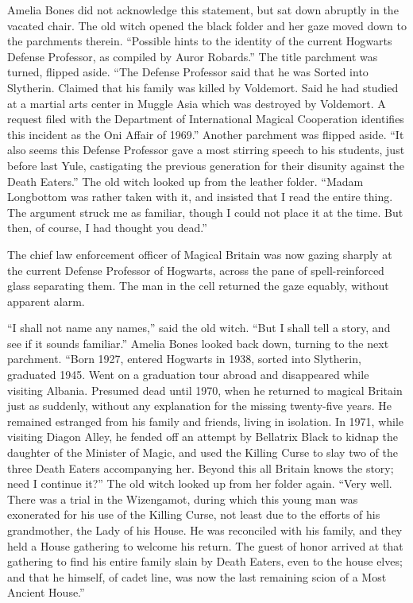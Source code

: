 Amelia Bones did not acknowledge this statement, but sat down abruptly in the vacated chair. The old witch opened the black folder and her gaze moved down to the parchments therein. ``Possible hints to the identity of the current Hogwarts Defense Professor, as compiled by Auror Robards.'' The title parchment was turned, flipped aside. ``The Defense Professor said that he was Sorted into Slytherin. Claimed that his family was killed by Voldemort. Said he had studied at a martial arts center in Muggle Asia which was destroyed by Voldemort. A request filed with the Department of International Magical Cooperation identifies this incident as the Oni Affair of 1969.'' Another parchment was flipped aside. ``It also seems this Defense Professor gave a most stirring speech to his students, just before last Yule, castigating the previous generation for their disunity against the Death Eaters.'' The old witch looked up from the leather folder. ``Madam Longbottom was rather taken with it, and insisted that I read the entire thing. The argument struck me as familiar, though I could not place it at the time. But then, of course, I had thought you dead.''

The chief law enforcement officer of Magical Britain was now gazing sharply at the current Defense Professor of Hogwarts, across the pane of spell-reinforced glass separating them. The man in the cell returned the gaze equably, without apparent alarm.

``I shall not name any names,'' said the old witch. ``But I shall tell a story, and see if it sounds familiar.'' Amelia Bones looked back down, turning to the next parchment. ``Born 1927, entered Hogwarts in 1938, sorted into Slytherin, graduated 1945. Went on a graduation tour abroad and disappeared while visiting Albania. Presumed dead until 1970, when he returned to magical Britain just as suddenly, without any explanation for the missing twenty-five years. He remained estranged from his family and friends, living in isolation. In 1971, while visiting Diagon Alley, he fended off an attempt by Bellatrix Black to kidnap the daughter of the Minister of Magic, and used the Killing Curse to slay two of the three Death Eaters accompanying her. Beyond this all Britain knows the story; need I continue it?'' The old witch looked up from her folder again. ``Very well. There was a trial in the Wizengamot, during which this young man was exonerated for his use of the Killing Curse, not least due to the efforts of his grandmother, the Lady of his House. He was reconciled with his family, and they held a House gathering to welcome his return. The guest of honor arrived at that gathering to find his entire family slain by Death Eaters, even to the house elves; and that he himself, of cadet line, was now the last remaining scion of a Most Ancient House.''

